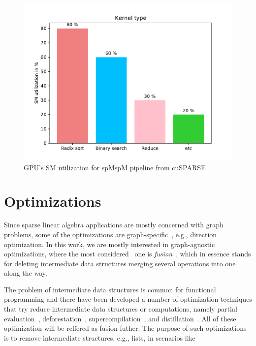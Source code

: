 \documentclass[sigplan,review,anonymous,nonacm]{acmart}\settopmatter{printfolios=true,printccs=false,printacmref=false}
\begin{document}
\begin{figure}[t]
    \centering
    \includegraphics[width=\linewidth]{figures/SM_perforance.pdf}
    \caption[Caption for LOF]{GPU's SM utilization for spMspM pipeline from cuSPARSE\footnotemark}
    \label{fig:sm_util}
\end{figure}

\section{Optimizations}

Since sparse linear algebra applications are mostly concerned with graph problems, some of the optimizations are graph-specific~\cite{yang2020graphblast,graphIt}, e.g., direction optimization. In this work, we are mostly interested in graph-agnostic optimizations, where the most considered~\cite{yang2020graphblast,graphIt} one is \emph{fusion}~\cite{fusion}, which in essence stands for deleting intermediate data structures merging several operations into one along the way. 

The problem of intermediate data structures is common for functional programming and there have been developed a number of optimization techniques that try reduce intermediate data structures or computations, namely partial evaluation~\cite{jones}, deforestation~\cite{WADLER1990231}, supercompilation~\cite{supercompilation}, and distillation~\cite{distillation}. All of these optimization will be reffered as fusion futher. The purpose of such optimizations is to remove intermediate structures, e.g., lists, in scenarios like
\end{document}

